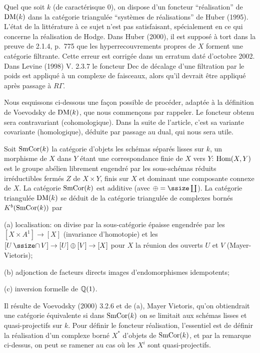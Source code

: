 \endsubhead
Quel que soit $k$ (de caract\'erisque $0$), on
dispose d'un foncteur ``r\'ealisation'' de
$\text{\rm DM}(k)$ dans la cat\'egorie triangul\'ee
``syst\`emes de r\'ealisations'' de Huber (1995).
L'\'etat de la litt\'erature \`a ce sujet
n'est pas satisfaisant, sp\'ecialement en ce qui
concerne la r\'ealisation de Hodge.
Dans Huber (2000), il est suppos\'e \`a tort
dans la preuve de 2.1.4, p.~775 que les
hyperrecouvrements propres de $X$ forment une
cat\'egorie filtrante.
Cette erreur est corrig\'ee dans un erratum
dat\'e d'octobre 2002.
Dans Levine (1998) V. 2.3.7 le foncteur Dec
de d\'ecalage d'une filtration par le poids
est appliqu\'e \`a un complexe de faisceaux,
alors qu'il devrait \^{e}tre appliqu\'e
apr\`es passage \`a $R\Gamma$.

Nous esquissons ci-dessous une fa\c{c}on
possible de proc\'eder, adapt\'ee \`a la
d\'efinition de Voevodsky
de $\text{\rm DM}(k)$, que nous commen\c{c}ons par
rappeler.
Le foncteur obtenu sera contravariant
(cohomologique).
Dans la suite de l'article, c'est sa variante
covariante (homologique), d\'eduite par
passage au dual, qui nous sera utile.

Soit $\text{\rm SmCor}(k)$ la cat\'egorie d'objets les
sch\'emas s\'epar\'es lisses sur $k$, un
morphisme de $X$ dans $Y$ \'etant une
correspondance finie de $X$ vers $Y$:
$\text{\rm Hom}(X,Y)$ est le groupe ab\'elien librement
engendr\'e par les sous-sch\'emas r\'eduits
irr\'eductibles ferm\'es $Z$ de $X\times Y$,
finis sur $X$ et dominant une composante
connexe de $X$.
La cat\'egorie $\text{\rm SmCor}(k)$ est additive
(avec $\oplus=\Coprod$).
La cat\'egorie triangul\'ee $\text{\rm DM}(k)$ se d\'eduit
de la cat\'egorie triangul\'ee de complexes
born\'es $K^b(\text{\rm SmCor}(k))$ par

\medskip\noindent
{\sans (a)} localisation:
on divise par la sous-cat\'egorie \'epaisse
engendr\'ee par les $[X\times A^1]\to[X]$
(invariance 
d'homotopie) et les $[U\CAP V]\to[U]\oplus[V]
\to[X]$ pour $X$ la r\'eunion des ouverts $U$
et $V$ (Mayer-Vietoris); 

\smallskip\noindent
{\sans (b)}\enspace 
adjonction de facteurs directs images
d'endomorphismes idempotents;

\smallskip\noindent
{\sans (c)}\enspace
inversion formelle de ${\Bbb Q}(1)$.

\medskip
Il r\'esulte de Voevodsky (2000) 
3.2.6 et de (a), Mayer
Vietoris, qu'on obtiendrait une cat\'egorie
\'equivalente si dans $\text{\rm SmCor}(k)$ on se
limitait aux sch\'emas lisses et
quasi-projectifs sur $k$.
Pour d\'efinir le foncteur r\'ealisation,
l'essentiel est de d\'efinir la r\'ealisation
d'un complexe born\'e $X^*$ d'objets de
$\text{\rm SmCor}(k)$, et par la remarque ci-dessus, on
peut se ramener au cas o\`u les $X^i$ sont
quasi-projectifs.

